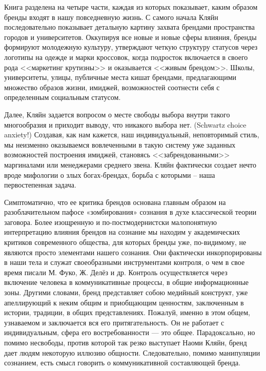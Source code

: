 Книга разделена на четыре части, каждая из которых показывает, каким образом бренды входят в нашу
повседневную жизнь. С самого начала Кляйн последовательно показывает детальную картину захвата
брендами пространства городов и университетов. Оккупируя все новые и новые сферы влияния, бренды
формируют молодежную культуру, утверждают четкую структуру статусов через логотипы на одежде и марки
кроссовок, когда подросток включается в своего рода <<маркетинг крутизны>> и оказывается <<живым
брендом>>. Школы, университеты, улицы, публичные места кишат брендами, предлагающими множество
образов жизни, имиджей, возможностей соотнести себя с определенным социальным статусом.

Далее, Кляйн задается вопросом о месте свободы выбора внутри такого многообразия и приходит выводу,
что никакого выбора нет. (Schwartz choice anxiety!) Создавая, как нам кажется, наш индивидуальный,
неповторимый стиль, мы неизменно оказываемся вовлеченными в такую систему уже заданных возможностей
построения имиджей, становясь <<забрендованными>> маргиналами или менеджерами среднего звена. Кляйн
фактически создает нечто вроде мифологии о злых богах-брендах, борьба с которыми -- наша
первостепенная задача.

Симптоматично, что ее критика брендов основана главным образом на разоблачительном пафосе
«зомбирования» сознания в духе классической теории заговора\autocite{entin2000}. Более изощренную и
по\hyp{}постмодернистски малопонятную интерпретацию влияния брендов на сознание мы находим у
академических критиков современного общества, для которых бренды уже, по-видимому, не являются
просто элементами нашего сознания.  Они фактически инкорпорированы в наши тела и служат
своеобразными инструментами контроля, о чем в свое время писали М. Фуко, Ж. Делёз и др. Контроль
осуществляется через включение человека в коммуникативные процессы, в общие информационные
зоны. Другими словами, бренд представляет собою медийный конструкт, уже апеллирующий к неким общим и
приобщающим ценностям, заключенным в истории, традиции, в общих представлениях. Пожалуй, именно в
этом общем, узнаваемом и заключается вся его притягательность. Он не работает с индивидуальным,
сфера его востребованности — это общее. Парадоксально, но помимо несвободы, против которой так резко
выступает Наоми Кляйн, бренд дает людям некоторую иллюзию общности. Следовательно, помимо
манипуляции сознанием, есть смысл говорить о коммуникативной составляющей бренда.

